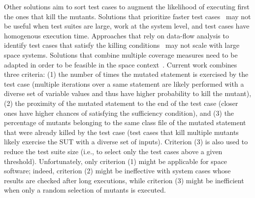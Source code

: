 Other solutions aim to sort test cases to augment the likelihood of executing first the ones that kill the mutants.
Solutions that prioritize faster test cases~\cite{just2012using}
 may not be useful when test suites are large, work at the system level, and test cases have homogenous execution time.
Approaches that rely on data-flow analysis to identify test cases that satisfy the killing conditions~\cite{papadakis2011automatically} may not scale with large space systems.
Solutions that combine multiple coverage measures need to be adapted in order 
to be feasible in the space context~\cite{zhang2013faster}.
Current work combines three criteria: (1) the number of times the mutated statement is exercised by the test case (multiple iterations over a same statement are likely performed with a diverse set of variable values and thus have higher probability to kill the mutant), (2) the proximity of the mutated statement to the end of the test case (closer ones have higher chances of satisfying the sufficiency condition), and (3) the percentage of mutants belonging to the same class file of the mutated statement that were already killed by the test case (test cases that kill multiple mutants likely exercise the SUT with a diverse set of inputs). 
Criterion (3) is also used to reduce the test suite size (i.e., to select only the test cases above a given threshold). 
Unfortunately, only criterion (1) might be applicable for space software; indeed, criterion (2) might be ineffective with system cases whose results are checked after long executions, while criterion (3) might be inefficient when only a random selection of mutants is executed. 






%
%
%




